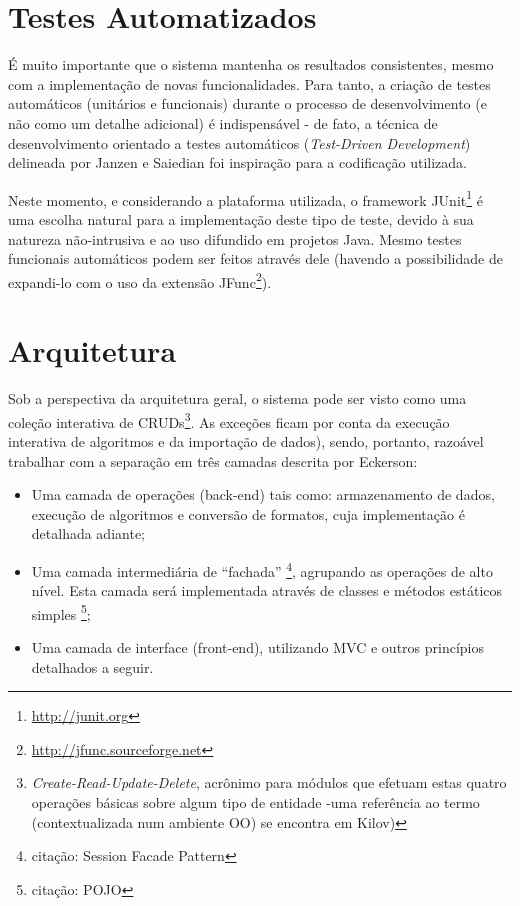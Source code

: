\documentclass{abnt}
\begin{document}
\section{Testes Automatizados}

É muito importante que o sistema mantenha os resultados consistentes, mesmo com a implementação de novas funcionalidades. Para tanto, a criação de testes automáticos (unitários e funcionais) durante o processo de desenvolvimento (e não como um detalhe adicional) é indispensável - de fato, a técnica de desenvolvimento orientado a testes automáticos (\textit{Test-Driven Development}) delineada por Janzen e Saiedian\cite{Janzen_Saiedian} foi inspiração para a codificação utilizada.

Neste momento, e considerando a plataforma utilizada, o framework JUnit\footnote{\url{http://junit.org}} é uma escolha natural para a implementação deste tipo de teste, devido à sua natureza não-intrusiva e ao uso difundido em projetos Java. Mesmo testes funcionais automáticos podem ser feitos através dele (havendo a possibilidade de expandi-lo com o uso da extensão JFunc\footnote{\url{http://jfunc.sourceforge.net}}).

\section{Arquitetura}

Sob a perspectiva da arquitetura geral, o sistema pode ser visto como uma coleção interativa de CRUDs\footnote{\textit{Create-Read-Update-Delete}, acrônimo para módulos que efetuam estas quatro operações básicas sobre algum tipo de entidade -uma referência ao termo (contextualizada num ambiente OO) se encontra em Kilov\cite{kilov_crud})}. As exceções ficam por conta da execução interativa de algoritmos e da importação de dados), sendo, portanto, razoável trabalhar com a separação em três camadas descrita por Eckerson\cite{Eckerson1995}:

\begin{itemize}
\item Uma camada de operações (back-end) tais como: armazenamento de dados, execução de algoritmos e conversão de formatos, cuja implementação é detalhada adiante;

\item Uma camada intermediária de “fachada” \footnote{citação: Session Facade Pattern}, agrupando as operações de alto nível. Esta camada será implementada através de classes e métodos estáticos simples \footnote{citação: POJO};

\item Uma camada de interface (front-end), utilizando MVC e outros princípios detalhados a seguir.
\end{itemize}
\end{document}
